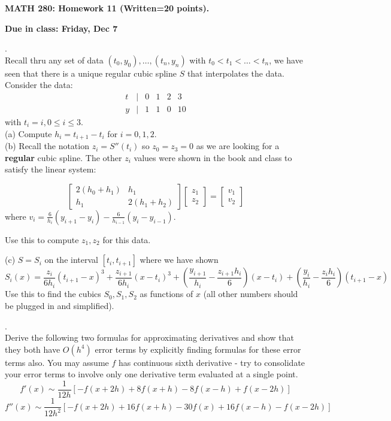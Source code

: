 \documentclass[12 pt]{article}
\begin{document}
\centerline{\bf MATH 280: Homework 11 (Written=20 points). }
\centerline{\bf Due in class: Friday, Dec 7}

\bigskip

. \\ Recall thru any set of data $(t_0, y_0), \dots, (t_n, y_n)$ with $t_0 < t_1 < \dots < t_n$, we have seen that there is a 
unique regular cubic spline $S$ that interpolates the data. 
Consider the data: \\
$$
\begin{matrix} t & | & 0 & 1 & 2 & 3 \\
y & | & 1 & 1 & 0 & 10 
\end{matrix}
$$
with $t_i=i, 0 \leq i \leq 3$. \\
(a) Compute $h_i=t_{i+1}-t_i$ for $i=0,1,2$. \\

\noindent
(b) Recall the notation $z_i=S''(t_i)$ so $z_0=z_3=0$ as we are looking for a {\bf regular} cubic spline. The other $z_i$ values were shown in the book and class 
to satisfy the linear system:

$$
\begin{bmatrix} 
2(h_0+h_1) & h_1 \\
h_1 & 2(h_1+h_2) 
\end{bmatrix}
\begin{bmatrix}
z_1 \\
z_2
\end{bmatrix}
=
\begin{bmatrix}
v_1 \\
v_2 
\end{bmatrix}
$$
where
$v_i=\frac{6}{h_i} (y_{i+1}-y_{i}) - \frac{6}{h_{i-1}}(y_i - y_{i-1})$.

Use this to compute $z_1, z_2$ for this data. 

\noindent
(c) $S=S_i$ on the interval $[t_i, t_{i+1}]$ where we have shown 
$$
S_i(x)=\frac{z_i}{6h_i}(t_{i+1}-x)^3 + \frac{z_{i+1}}{6h_i}(x-t_i)^3 + (\frac{y_{i+1}}{h_i}-\frac{z_{i+1}h_i}{6})(x-t_i) + (\frac{y_i}{h_i}-\frac{z_ih_i}{6})(t_{i+1}-x)
$$
Use this to find the cubics $S_0, S_1, S_2$ as functions of $x$ (all other numbers should be plugged in and simplified).

\bigskip

. \\ Derive the following two formulas for approximating derivatives and show that they both have $O(h^4)$ error terms by explicitly finding 
formulas for these error terms also. You may assume $f$ has continuous sixth derivative - try to consolidate your error terms to involve only one 
derivative term evaluated at a single point.
$$
f'(x) \sim \frac{1}{12h}[-f(x+2h)+8f(x+h)-8f(x-h)+f(x-2h)] 
$$
$$
f''(x) \sim \frac{1}{12h^2}[-f(x+2h)+16f(x+h)-30f(x)+16f(x-h)-f(x-2h)]
$$
\end{document}
